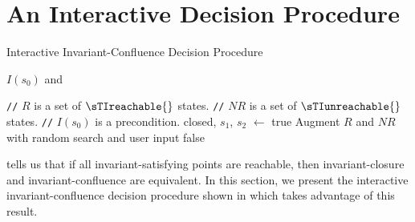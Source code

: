 \section{An Interactive Decision Procedure}
\newcommand{\Helper}{\textsf{Helper}}
\newcommand{\IsIclosed}{\textsf{IsIclosed}}
\newcommand{\IsInvConfluent}{\textsf{IsInvConfluent}}

\newcommand{\algocomment}[1]{\State \textcolor{flatdenim}{\texttt{//} #1}}
\begin{algorithm}[t]
  \caption{Interactive Invariant-Confluence Decision Procedure}%
  \begin{algorithmic}
    \State
    \Return $I(s_0)$ and
    \EndFunction

    \State

    \algocomment{$R$ is a set of $\sTIreachable{}$ states.}
    \algocomment{$NR$ is a set of $\sTIunreachable{}$ states.}
    \algocomment{$I(s_0)$ is a precondition.}
    \State closed, $s_1$, $s_2$ $\gets$ 
      \State \Return true
    \EndIf
    \State Augment $R$ and $NR$ with random search and user input
    \Return false
    \Else\
    \Return {}
    \EndIf
    \EndFunction
  \end{algorithmic}
\end{algorithm}

 tells us that if all
invariant-satisfying points are reachable, then invariant-closure and
invariant-confluence are equivalent. In this section, we present the
interactive invariant-confluence decision procedure shown in
 which takes advantage of this result.

